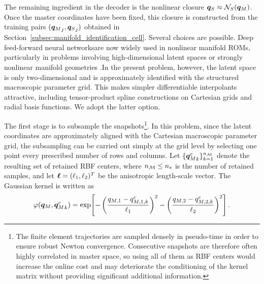 \documentclass[11pt,a4paper]{article}
\newcommand{\PROMPT}[1]{ }
\begin{document}
 \PROMPT{}
  \PROMPT{}

The remaining ingredient in the decoder is the nonlinear closure
$\bm{q}_{S}\approx\mathcal{N}_{S}(\bm{q}_M)$. Once the master coordinates have been fixed, this
closure is constructed from the training pairs $({\bm{q}_M}_j,{\bm{q}_{S}}_j)$ obtained in
Section~\ref{subsec:manifold_identification_cell}. Several choices are possible.
Deep feed-forward neural networksare now widely used in nonlinear manifold ROMs, particularly in
problems involving high-dimensional latent spaces or strongly nonlinear
manifold geometries
\cite{barnett2023neural}.In the present problem, however, the latent space is only two-dimensional and
is approximately identified with the structured macroscopic parameter grid.
This makes simpler differentiable interpolants attractive, including
tensor-product spline constructions on Cartesian grids and radial basis
functions. We adopt the latter option.


The first stage is to subsample the snapshots\footnote{The finite element
trajectories are sampled densely in pseudo-time in order to ensure robust
Newton convergence. Consecutive snapshots are therefore often highly
correlated in master space, so using all of them as RBF centers would increase
the online cost and may deteriorate the conditioning of the kernel matrix
without providing significant additional information.}. In this problem, since the latent coordinates are approximately aligned with the Cartesian
macroscopic parameter grid, the subsampling can be carried out simply at the
grid level by selecting one point every prescribed number of rows and columns.
Let $\{{\bm{q}_M^{c}}_k\}_{k=1}^{n_{\mathcal{M}}}$ denote the resulting set of retained RBF
centers, where $n_{\mathcal{M}}\le n_s$ is the number of retained samples, and let
$\bm{\ell}=(\ell_1,\ell_2)^T$ be the anisotropic length-scale vector. The Gaussian kernel is written as
\begin{equation}
\label{eq:RBF_kernel}
    \varphi(\bm{q}_M,{\bm{q}_M^{c}}_k)
    =
    \exp\!\left[
    -
    \left(
    \frac{q_{M,1}-q^c_{M,1,k}}{\ell_1}
    \right)^2
    -
    \left(
    \frac{q_{M,2}-q^c_{M,2,k}}{\ell_2}
    \right)^2
    \right].
\end{equation}
\end{document}
